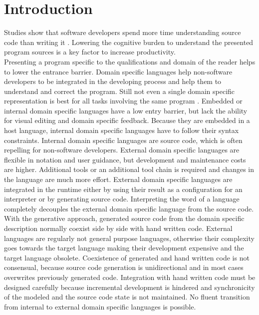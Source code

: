 \chapter{Introduction}
\label{cha:introduction}
Studies show that software developers spend more time understanding source code than writing it \cite{uistudy}. Lowering the cognitive burden to understand the presented program sources is a key factor to increase productivity. \\

Presenting a program specific to the qualifications and domain of the reader helps to lower the entrance barrier. Domain specific languages help non-software developers to be integrated in the developing process and help them to understand and correct the program. Still not even a single domain specific representation is best for all tasks involving the same program \cite{Petri}. Embedded or internal domain specific languages have a low entry barrier, but lack the ability for visual editing and domain specific feedback. Because they are embedded in a host language, internal domain specific languages have to follow their syntax constraints. Internal domain specific languages are source code, which is often repelling for non-software developers. External domain specific languages are flexible in notation and user guidance, but development and maintenance costs are higher. Additional tools or an additional tool chain is required and changes in the language are much more effort. External domain specific languages are integrated in the runtime either by using their result as a configuration for an interpreter or by generating source code. Interpreting the word of a language completely decouples the external domain specific language from the source code. With the generative approach, generated source code from the domain specific description normally coexist side by side with hand written code. External languages are regularly not general purpose languages, otherwise their complexity goes towards the target language making their development expensive and the target language obsolete. Coexistence of generated and hand written code is not consensual, because source code generation is unidirectional and in most cases overwrites previously generated code. Integration with hand written code must be designed carefully because incremental development is hindered and synchronicity of the modeled and the source code state is not maintained. No fluent transition from internal to external domain specific languages is possible.   

